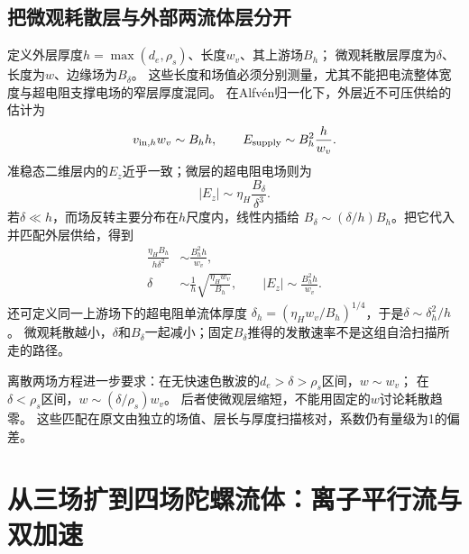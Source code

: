 \subsection{把微观耗散层与外部两流体层分开}
定义外层厚度$h=\max(d_e,\rho_s)$、长度$w_v$、其上游场$B_h$；
微观耗散层厚度为$\delta$、长度为$w$、边缘场为$B_\delta$。
这些长度和场值必须分别测量，尤其不能把电流整体宽度与超电阻支撑电场的窄层厚度混同。
在Alfvén归一化下，外层近不可压供给的估计为
\begin{equation}
 v_{{\rm in},h}w_v\sim B_hh,\qquad
 E_{\rm supply}\sim B_h^2\frac h{w_v}.
\end{equation}
准稳态二维层内的$E_z$近乎一致；微层的超电阻电场则为
\begin{equation}
 |E_z|\sim\eta_H\frac{B_\delta}{\delta^3}.
\end{equation}
若$\delta\ll h$，而场反转主要分布在$h$尺度内，线性内插给
$B_\delta\sim(\delta/h)B_h$。把它代入并匹配外层供给，得到
\begin{align}
 \frac{\eta_HB_h}{h\delta^2}&\sim\frac{B_h^2h}{w_v},\\
 \delta&\sim\frac1h\sqrt{\frac{\eta_Hw_v}{B_h}},\qquad
 |E_z|\sim\frac{B_h^2h}{w_v}.
 \label{eq:two_layer_rate}
\end{align}
还可定义同一上游场下的超电阻单流体厚度
$\delta_h=(\eta_Hw_v/B_h)^{1/4}$，于是$\delta\sim\delta_h^2/h$。
微观耗散越小，$\delta$和$B_\delta$一起减小；固定$B_\delta$推得的发散速率不是这组自洽扫描所走的路径。

离散两场方程进一步要求：在无快速色散波的$d_e>\delta>\rho_s$区间，$w\sim w_v$；
在$\delta<\rho_s$区间，$w\sim(\delta/\rho_s)w_v$。
后者使微观层缩短，不能用固定的$w$讨论耗散趋零。
这些匹配在原文由独立的场值、层长与厚度扫描核对，系数仍有量级为1的偏差。


\section{从三场扩到四场陀螺流体：离子平行流与双加速}
